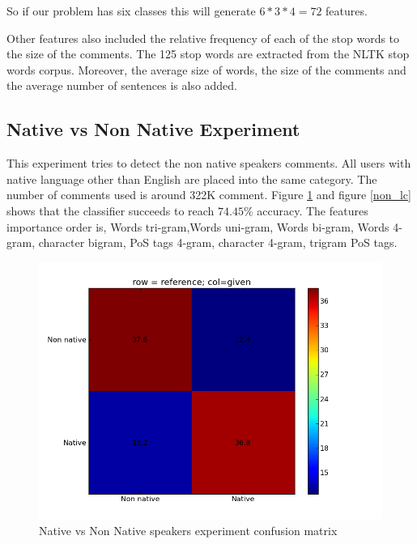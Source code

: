\documentclass[11pt]{article}
\begin{document}
So if our problem has six classes this will generate $6*3*4 = 72$ features.

Other features also included the relative frequency of each of the stop words to the size of the comments. The  125 stop words are extracted from the NLTK stop words corpus. Moreover, the average size of words, the size of the comments and the average number  of sentences is also added.


\subsection{Native vs Non Native Experiment}
This experiment tries to detect the non native speakers comments. All users with native language other than English are placed into the same category. The number of comments used is around 322K comment. Figure \ref{non_cfm} and figure \ref{non_lc} shows that the classifier succeeds to reach $74.45\%$ accuracy. The features importance order is, Words tri-gram,Words uni-gram, Words bi-gram, Words 4-gram, character bigram, PoS tags 4-gram, character 4-gram, trigram PoS tags.




\begin{figure}[htp]
\centering
\includegraphics[scale=0.45]{native_cfm.png}
\caption{Native vs Non Native speakers experiment confusion matrix}
\label{non_cfm}
\end{figure}
\end{document}
